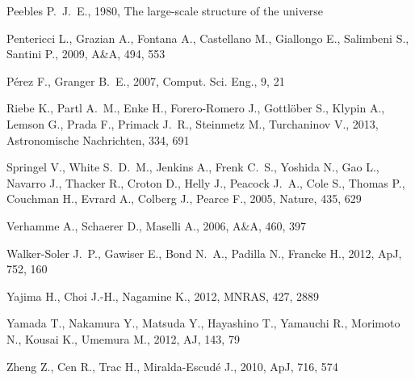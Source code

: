 \documentclass[usenatbib]{mn2e}
\newcommand{\apj}{ApJ}
\newcommand{\aj}{AJ}
\newcommand{\mnras}{MNRAS}
\newcommand{\aap}{A\&A}
\newcommand{\nat}{Nature}
\begin{document}
\begin{thebibliography}{}
{Peebles} P.~J.~E.,  1980, {The large-scale structure of the universe}

{Pentericci} L.,  {Grazian} A.,  {Fontana} A.,  {Castellano} M.,  {Giallongo}
  E.,  {Salimbeni} S.,    {Santini} P.,  2009, \aap, 494, 553

P\'erez F.,  Granger B.~E.,  2007, {C}omput. {S}ci. {E}ng., 9, 21

Riebe K.,  Partl A.~M.,  Enke H.,  Forero-Romero J.,  Gottlöber S.,  Klypin
  A.,  Lemson G.,  Prada F.,  Primack J.~R.,  Steinmetz M.,    Turchaninov V.,
  2013, Astronomische Nachrichten, 334, 691

{Springel} V.,  {White} S.~D.~M.,  {Jenkins} A.,  {Frenk} C.~S.,  {Yoshida} N.,
   {Gao} L.,  {Navarro} J.,  {Thacker} R.,  {Croton} D.,  {Helly} J.,
  {Peacock} J.~A.,  {Cole} S.,  {Thomas} P.,  {Couchman} H.,  {Evrard} A.,
  {Colberg} J.,    {Pearce} F.,  2005, \nat, 435, 629

{Verhamme} A.,  {Schaerer} D.,    {Maselli} A.,  2006, \aap, 460, 397

{Walker-Soler} J.~P.,  {Gawiser} E.,  {Bond} N.~A.,  {Padilla} N.,    {Francke}
  H.,  2012, \apj, 752, 160

{Yajima} H.,  {Choi} J.-H.,    {Nagamine} K.,  2012, \mnras, 427, 2889

{Yamada} T.,  {Nakamura} Y.,  {Matsuda} Y.,  {Hayashino} T.,  {Yamauchi} R.,
  {Morimoto} N.,  {Kousai} K.,    {Umemura} M.,  2012, \aj, 143, 79

{Zheng} Z.,  {Cen} R.,  {Trac} H.,    {Miralda-Escud{\'e}} J.,  2010, \apj,
  716, 574

\end{thebibliography}

% 
\end{document}
